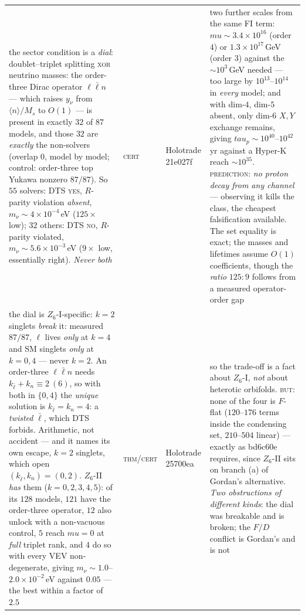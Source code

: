 \documentclass[12pt,a4paper]{article}
\def\mathbb#1{#1}%
\def\textbf#1{#1}%
\def\texttt#1{#1}%
\def\mu{mu}%
\def\tau{tau}%
\theoremstyle{definition}
\newcommand{\ZZ}{\mathbb{Z}}
\begin{document}
\begin{center}
\begin{tabular}{@{}p{}llp{}@{}}
\textbf{the sector condition is a \emph{dial}: doublet--triplet splitting \textsc{xor} neutrino masses}: the order-three Dirac operator $\ell\bar\ell n$ --- which raises $y_\nu$ from $\langle n\rangle/M_s$ to $O(1)$ --- is present in exactly $32$ of $87$ models, and those $32$ are \emph{exactly} the non-solvers (overlap $0$, model by model; control: order-three top Yukawa nonzero $87/87$). So $55$ solvers: DTS \textsc{yes}, $R$-parity violation \emph{absent}, $m_\nu\!\sim\!4\times10^{-4}$\,eV ($125\times$ low); $32$ others: DTS \textsc{no}, $R$-parity violated, $m_\nu\!\sim\!5.6\times10^{-3}$\,eV ($9\times$ low, essentially right). \emph{Never both} & \textsc{cert} & Holotrade \texttt{21e027f} & two further scales from the same FI term: $\mu\!\sim\!3.4\times10^{16}$ (order $4$) or $1.3\times10^{17}$\,GeV (order $3$) against the $\sim\!10^3$\,GeV needed --- too large by $10^{13}$--$10^{14}$ in \emph{every} model; and with dim-$4$, dim-$5$ absent, only dim-$6$ $X,Y$ exchange remains, giving $\tau_p\sim10^{40}$--$10^{42}$ yr against a Hyper-K reach $\sim\!10^{35}$. \textsc{prediction}: \emph{no proton decay from any channel} --- observing it kills the class, the cheapest falsification available. The set equality is exact; the masses and lifetimes assume $O(1)$ coefficients, though the \emph{ratio} $125\!:\!9$ follows from a measured operator-order gap \\
\textbf{the dial is $\ZZ_6$-I-specific: $k{=}2$ singlets \emph{break} it}: measured $87/87$, $\ell$ lives \emph{only} at $k{=}4$ and SM singlets \emph{only} at $k{=}0,4$ --- never $k{=}2$. An order-three $\ell\bar\ell n$ needs $k_{\bar\ell}{+}k_n\equiv2\ (6)$, so with both in $\{0,4\}$ the \emph{unique} solution is $k_{\bar\ell}{=}k_n{=}4$: a \emph{twisted} $\bar\ell$, which DTS forbids. Arithmetic, not accident --- and it names its own escape, $k{=}2$ singlets, which open $(k_{\bar\ell},k_n)=(0,2)$. $\ZZ_6$-II \emph{has} them ($k=0,2,3,4,5$): of its $128$ models, $121$ have the order-three operator, $12$ also unlock with a non-vacuous control, $5$ reach $\mu{=}0$ at \emph{full} triplet rank, and $4$ do so with every VEV non-degenerate, giving $m_\nu\sim1.0$--$2.0\times10^{-2}$\,eV against $0.05$ --- the best within a \textbf{factor of $2.5$} & \textsc{thm}/\textsc{cert} & Holotrade \texttt{25700ea} & so the trade-off is a fact about $\ZZ_6$-I, \emph{not} about heterotic orbifolds. \textsc{but}: none of the four is $F$-flat ($120$--$176$ terms inside the condensing set, $210$--$504$ linear) --- exactly as \texttt{bd6c60e} requires, since $\ZZ_6$-II sits on branch (a) of Gordan's alternative. \emph{Two obstructions of different kinds}: the dial was breakable and is broken; the $F/D$ conflict is Gordan's and is not \\

\end{tabular}
\end{center}
\end{document}
